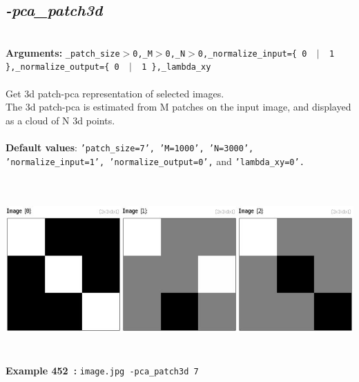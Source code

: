 \documentclass[a4paper,11pt,twoside]{book}
\begin{document}
\subsection{\emph{-pca\_patch3d} }\vspace*{-0.5em}
~\\\textbf{Arguments: } 
{\small \texttt{\_patch\_size$>$0,\_M$>$0,\_N$>$0,\_normalize\_input=\{ 0 ~$|$~ 1 \},\_normalize\_output=\{ 0 ~$|$~ 1 \},\_lambda\_xy}}\\~\\
Get 3d patch-pca representation of selected images.
~\\The 3d patch-pca is estimated from M patches on the input image, and displayed as a cloud of N 3d points.
~\\~\\\textbf{Default values}: {\small \texttt{'patch\_size=7', 'M=1000', 'N=3000', 'normalize\_input=1', 'normalize\_output=0',} and \texttt{'lambda\_xy=0'.}}
\begin{center}\includegraphics[keepaspectratio=true,height=7cm,width=\textwidth]{img/gmic_def452.jpg}\\
{\footnotesize \textbf{Example 452~:} \texttt{image.jpg -pca\_patch3d 7}}
\end{center}
\end{document}
